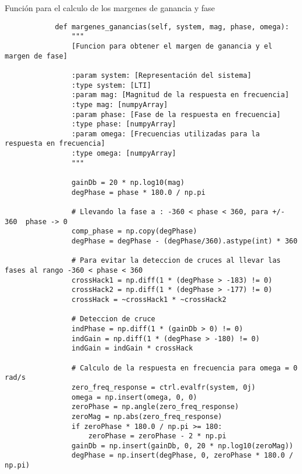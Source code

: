     \begin{longlisting}
        \caption[Calculo de los margenes de ganancia y fase]{Función para el calculo de los margenes de ganancia y fase}
        \label{code:1}				
        \begin{verbatim}
            def margenes_ganancias(self, system, mag, phase, omega):
                """
                [Funcion para obtener el margen de ganancia y el margen de fase]
                
                :param system: [Representación del sistema]
                :type system: [LTI]
                :param mag: [Magnitud de la respuesta en frecuencia]
                :type mag: [numpyArray]
                :param phase: [Fase de la respuesta en frecuencia]
                :type phase: [numpyArray]
                :param omega: [Frecuencias utilizadas para la respuesta en frecuencia]
                :type omega: [numpyArray]
                """

                gainDb = 20 * np.log10(mag)
                degPhase = phase * 180.0 / np.pi

                # Llevando la fase a : -360 < phase < 360, para +/- 360  phase -> 0
                comp_phase = np.copy(degPhase)
                degPhase = degPhase - (degPhase/360).astype(int) * 360

                # Para evitar la deteccion de cruces al llevar las fases al rango -360 < phase < 360
                crossHack1 = np.diff(1 * (degPhase > -183) != 0)
                crossHack2 = np.diff(1 * (degPhase > -177) != 0)
                crossHack = ~crossHack1 * ~crossHack2

                # Deteccion de cruce
                indPhase = np.diff(1 * (gainDb > 0) != 0)
                indGain = np.diff(1 * (degPhase > -180) != 0)
                indGain = indGain * crossHack

                # Calculo de la respuesta en frecuencia para omega = 0 rad/s
                zero_freq_response = ctrl.evalfr(system, 0j)
                omega = np.insert(omega, 0, 0)
                zeroPhase = np.angle(zero_freq_response)
                zeroMag = np.abs(zero_freq_response)
                if zeroPhase * 180.0 / np.pi >= 180:
                    zeroPhase = zeroPhase - 2 * np.pi
                gainDb = np.insert(gainDb, 0, 20 * np.log10(zeroMag))
                degPhase = np.insert(degPhase, 0, zeroPhase * 180.0 / np.pi)


\end{verbatim}
\end{longlisting}
